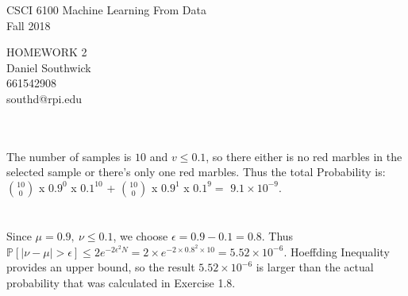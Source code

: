 \documentclass[12pt]{article}
\begin{document}
\begin{center}
CSCI 6100 Machine Learning From Data\\
Fall 2018\\
\end{center}
\begin{center}
HOMEWORK 2\\
Daniel Southwick\\
661542908\\
southd@rpi.edu
\end{center}
\vspace{.1in}

 \\\\
\indent The number of samples is $10$ and $v \leq 0.1$, so there either is no red marbles in the selected sample or there's only one red marbles. Thus the total Probability is: \\ $10 \choose 0$ x $0.9^0$ x $0.1^10$ + $10 \choose 0$ x $0.9^1$ x $0.1^9 = $ $9.1\times10^{-9}$.\\

 \\\\
\indent Since $\mu = 0.9,\ \nu\leq 0.1$, we choose $\epsilon = 0.9 - 0.1 = 0.8$. Thus $\mathbb{P}[|\nu-\mu|>\epsilon] \leq 2e^{-2\epsilon^2N} = 2\times e^{-2\times0.8^2\times10} = 5.52 \times 10^{-6}$. Hoeffding Inequality provides an upper bound, so the result $5.52 \times 10^{-6}$ is larger than the actual probability that was calculated in Exercise 1.8.\\
\end{document}
